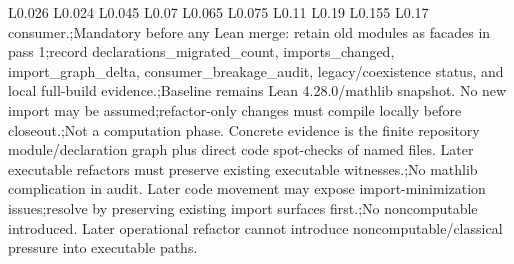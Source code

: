 \begin{longtable}{L{0.026\linewidth} L{0.024\linewidth} L{0.045\linewidth} L{0.07\linewidth} L{0.065\linewidth} L{0.075\linewidth} L{0.11\linewidth} L{0.19\linewidth} L{0.155\linewidth} L{0.17\linewidth}}
consumer.;\newline Mandatory before any Lean merge: retain old modules as facades in pass 1;\newline record declarations\_migrated\_count, imports\_changed, import\_graph\_delta, consumer\_breakage\_audit, legacy/\allowbreak{}coexistence status, and local full-build evidence.;\newline Baseline remains Lean 4.28.0/\allowbreak{}mathlib snapshot. No new import may be assumed;\newline refactor-only changes must compile locally before closeout.;\newline Not a computation phase. Concrete evidence is the finite repository module/\allowbreak{}declaration graph plus direct code spot-checks of named files. Later executable refactors must preserve existing executable witnesses.;\newline No mathlib complication in audit. Later code movement may expose import-minimization issues;\newline resolve by preserving existing import surfaces first.;\newline No noncomputable introduced. Later operational refactor cannot introduce noncomputable/\allowbreak{}classical pressure into executable paths.\\
\hline
\addlinespace[0.24em]

\end{longtable}
